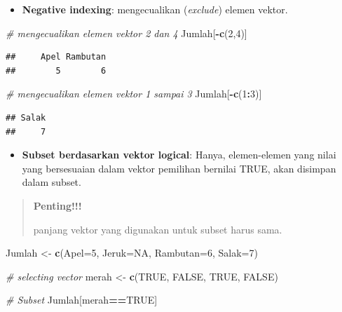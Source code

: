 \documentclass[
]{book}
\newenvironment{Shaded}{\begin{snugshade}}{\end{snugshade}}
\newcommand{\AttributeTok}[1]{\textcolor[rgb]{0.13,0.29,0.53}{#1}}
\newcommand{\CommentTok}[1]{\textcolor[rgb]{0.56,0.35,0.01}{\textit{#1}}}
\newcommand{\ConstantTok}[1]{\textcolor[rgb]{0.56,0.35,0.01}{#1}}
\newcommand{\DecValTok}[1]{\textcolor[rgb]{0.00,0.00,0.81}{#1}}
\newcommand{\FunctionTok}[1]{\textcolor[rgb]{0.13,0.29,0.53}{\textbf{#1}}}
\newcommand{\NormalTok}[1]{#1}
\newcommand{\OtherTok}[1]{\textcolor[rgb]{0.56,0.35,0.01}{#1}}
\newcommand{\SpecialCharTok}[1]{\textcolor[rgb]{0.81,0.36,0.00}{\textbf{#1}}}
\providecommand{\tightlist}{%
  \setlength{\itemsep}{0pt}\setlength{\parskip}{0pt}}
\theoremstyle{definition}
\theoremstyle{definition}
\theoremstyle{definition}
\theoremstyle{definition}
\theoremstyle{remark}
\begin{document}
\begin{itemize}
\tightlist
\item
  \textbf{Negative indexing}: mengecualikan (\emph{exclude}) elemen vektor.
\end{itemize}

\begin{Shaded}
\begin{Highlighting}[]
\CommentTok{\# mengecualikan elemen vektor 2 dan 4}
\NormalTok{Jumlah[}\SpecialCharTok{{-}}\FunctionTok{c}\NormalTok{(}\DecValTok{2}\NormalTok{,}\DecValTok{4}\NormalTok{)]}
\end{Highlighting}
\end{Shaded}

\begin{verbatim}
##     Apel Rambutan 
##        5        6
\end{verbatim}

\begin{Shaded}
\begin{Highlighting}[]
\CommentTok{\# mengecualikan elemen vektor 1 sampai 3}
\NormalTok{Jumlah[}\SpecialCharTok{{-}}\FunctionTok{c}\NormalTok{(}\DecValTok{1}\SpecialCharTok{:}\DecValTok{3}\NormalTok{)]}
\end{Highlighting}
\end{Shaded}

\begin{verbatim}
## Salak 
##     7
\end{verbatim}

\begin{itemize}
\tightlist
\item
  \textbf{Subset berdasarkan vektor logical}: Hanya, elemen-elemen yang nilai yang bersesuaian dalam vektor pemilihan bernilai TRUE, akan disimpan dalam subset.
\end{itemize}

\begin{quote}
\textbf{Penting!!!}

panjang vektor yang digunakan untuk subset harus sama.
\end{quote}

\begin{Shaded}
\begin{Highlighting}[]
\NormalTok{Jumlah }\OtherTok{\textless{}{-}} \FunctionTok{c}\NormalTok{(}\AttributeTok{Apel=}\DecValTok{5}\NormalTok{, }\AttributeTok{Jeruk=}\ConstantTok{NA}\NormalTok{, }\AttributeTok{Rambutan=}\DecValTok{6}\NormalTok{, }\AttributeTok{Salak=}\DecValTok{7}\NormalTok{)}

\CommentTok{\# selecting vector}
\NormalTok{merah }\OtherTok{\textless{}{-}} \FunctionTok{c}\NormalTok{(}\ConstantTok{TRUE}\NormalTok{, }\ConstantTok{FALSE}\NormalTok{, }\ConstantTok{TRUE}\NormalTok{, }\ConstantTok{FALSE}\NormalTok{)}

\CommentTok{\# Subset}
\NormalTok{Jumlah[merah}\SpecialCharTok{==}\ConstantTok{TRUE}\NormalTok{]}
\end{Highlighting}
\end{Shaded}
\end{document}
